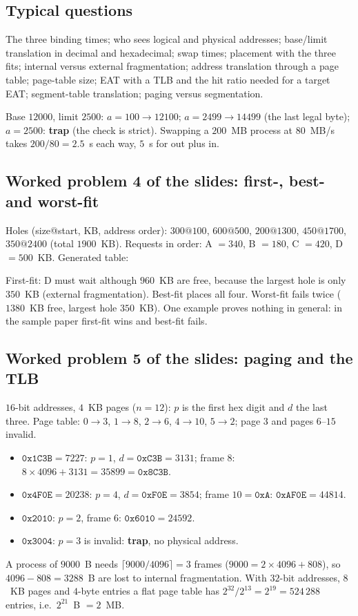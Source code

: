 \documentclass[11pt,a4paper]{article}
\begin{document}
\subsection*{Typical questions}
The three binding times; who sees logical and physical addresses; base/limit translation in decimal and hexadecimal; swap times; placement with the three fits; internal versus external fragmentation; address translation through a page table; page-table size; EAT with a TLB and the hit ratio needed for a target EAT; segment-table translation; paging versus segmentation.

\begin{example}
Base $12000$, limit $2500$: $a = 100 \to 12100$; $a = 2499 \to 14499$ (the last legal byte); $a = 2500$: \textbf{trap} (the check is strict). Swapping a $200$~MB process at $80$~MB/s takes $200/80 = 2.5$~s each way, $5$~s for out plus in.
\end{example}

\subsection{Worked problem 4 of the slides: first-, best- and worst-fit}
Holes (size@start, KB, address order): $300@100$, $600@500$, $200@1300$, $450@1700$, $350@2400$ (total $1900$~KB). Requests in order: A $= 340$, B $= 180$, C $= 420$, D $= 500$~KB. Generated table:
\begin{center}\small{}\end{center}
First-fit: D must wait although $960$~KB are free, because the largest hole is only $350$~KB (external fragmentation). Best-fit places all four. Worst-fit fails twice ($1380$~KB free, largest hole $350$~KB). One example proves nothing in general: in the sample paper first-fit wins and best-fit fails.

\subsection{Worked problem 5 of the slides: paging and the TLB}
$16$-bit addresses, $4$~KB pages ($n = 12$): $p$ is the first hex digit and $d$ the last three. Page table: $0\to3$, $1\to8$, $2\to6$, $4\to10$, $5\to2$; page $3$ and pages $6$--$15$ invalid.
\begin{itemize}
  \item $\texttt{0x1C3B} = 7227$: $p = 1$, $d = \texttt{0xC3B} = 3131$; frame $8$: $8 \times 4096 + 3131 = 35899 = \texttt{0x8C3B}$.
  \item $\texttt{0x4F0E} = 20238$: $p = 4$, $d = \texttt{0xF0E} = 3854$; frame $10 = \texttt{0xA}$: $\texttt{0xAF0E} = 44814$.
  \item $\texttt{0x2010}$: $p = 2$, frame $6$: $\texttt{0x6010} = 24592$.
  \item $\texttt{0x3004}$: $p = 3$ is invalid: \textbf{trap}, no physical address.
\end{itemize}
A process of $9000$~B needs $\lceil 9000/4096\rceil = 3$ frames ($9000 = 2\times4096 + 808$), so $4096 - 808 = 3288$~B are lost to internal fragmentation. With $32$-bit addresses, $8$~KB pages and $4$-byte entries a flat page table has $2^{32}/2^{13} = 2^{19} = 524\,288$ entries, i.e.\ $2^{21}$~B $= 2$~MB.
\end{document}
